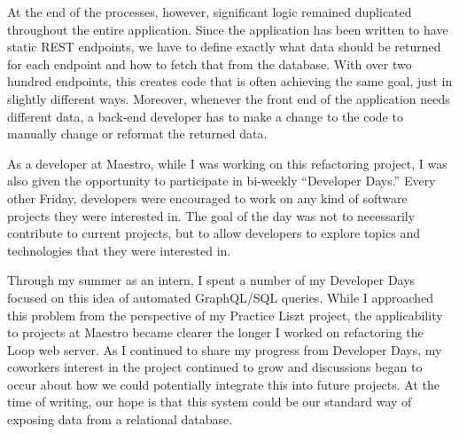 At the end of the processes, however, significant logic remained duplicated throughout the entire application.  Since the application has been written to have static REST endpoints, we have to define exactly what data should be returned for each endpoint and how to fetch that from the database. With over two hundred endpoints, this creates code that is often achieving the same goal, just in slightly different ways.  Moreover, whenever the front end of the application needs different data, a back-end developer has to make a change to the code to manually change or reformat the returned data.

As a developer at Maestro, while I was working on this refactoring project, I was also given the opportunity to participate in bi-weekly ``Developer Days.''  Every other Friday, developers were encouraged to work on any kind of software projects they were interested in.  The goal of the day was not to necessarily contribute to current projects, but to allow developers to explore topics and technologies that they were interested in.

Through my summer as an intern, I spent a number of my Developer Days focused on this idea of automated GraphQL/SQL queries. While I approached this problem from the perspective of my Practice Liszt project, the applicability to projects at Maestro became clearer the longer I worked on refactoring the Loop web server.  As I continued to share my progress from Developer Days, my coworkers interest in the project continued to grow and discussions began to occur about how we could potentially integrate this into future projects.  At the time of writing, our hope is that this system could be our standard way of exposing data from a relational database.